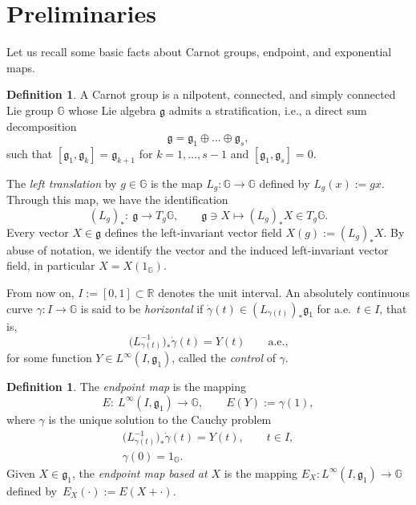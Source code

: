\documentclass[10pt,a4paper]{amsart}
\numberwithin{equation}{section}
\theoremstyle{definition}
\newtheorem{Definition}[Theorem]{Definition}
\begin{document}
\section{Preliminaries}

Let us recall some basic facts about Carnot groups, endpoint, and exponential maps.

\begin{Definition}\label{def:carnotgp}
 A Carnot group is a nilpotent, connected, and simply connected Lie group $\mathbb{G}$ whose Lie algebra ${\mathfrak g}$ admits a stratification, i.e., a direct sum decomposition{\samepage
 \begin{equation*}
 {\mathfrak g}={\mathfrak g}_1\oplus \dots \oplus {\mathfrak g}_s,
 \end{equation*}
 such that $[{\mathfrak g}_1,{\mathfrak g}_k]=
 {\mathfrak g}_{k+1}$ for $k=1,\dots,s-1$ and $[{\mathfrak g}_1,{\mathfrak g}_s]=0$.}
\end{Definition}

The \emph{left translation} by $g\in \mathbb{G}$ is the map $L_g\colon \mathbb{G}\to\mathbb{G}$ defined by $L_g(x):=gx$. Through this map, we have the identification
\begin{equation*}
 (L_g)_*\colon \ {\mathfrak g}\to T_g\mathbb{G}, \qquad {\mathfrak g}\ni X\mapsto (L_g)_*X\in T_g\mathbb{G}.
\end{equation*}
Every vector $X\in{\mathfrak g}$ defines the left-invariant vector field $X(g):=(L_g)_*X$. By abuse of notation, we identify the vector and the induced left-invariant vector field, in particular $X=X(1_\mathbb{G})$.

From now on, $I:=[0,1]\subset\mathbb{R}$ denotes the unit interval.
An absolutely continuous curve $\gamma\colon I\to\mathbb{G}$ is said to be \emph{horizontal} if
$\dot\gamma(t)\in (L_{\gamma(t)})_*{\mathfrak g}_1$
 for a.e.\ $t\in I$, that is,
\begin{equation*}
 \bigl(L_{\gamma(t)}^{-1}\bigr)_*
 \dot\gamma(t)=Y(t)\qquad\mbox{a.e.,}
\end{equation*}
for some function $Y\in L^\infty(I,{\mathfrak g}_1)$, called the \emph{control} of $\gamma$.
\begin{Definition}
\label{def:endpoint}
The \emph{endpoint map} is the mapping
 \begin{equation*}
 E\colon \ L^\infty(I,{\mathfrak g}_1)\to\mathbb{G}, \qquad E(Y):=\gamma(1),
 \end{equation*}
 where $\gamma$ is the unique solution to the Cauchy problem
 \begin{gather*}
 \bigl(L_{\gamma(t)}^{-1}\bigr)_* \dot\gamma(t)=Y(t),\qquad t\in I,\\
 \gamma(0)=1_\mathbb{G}.
 \end{gather*}
Given $X\in{\mathfrak g}_1$, the \emph{endpoint map based at $X$} is the mapping $E_X\colon L^\infty(I,{\mathfrak g}_1)\to \mathbb{G}$ defined by~${E_X(\cdot):=E(X+\cdot)}$.
\end{Definition}
\end{document}

